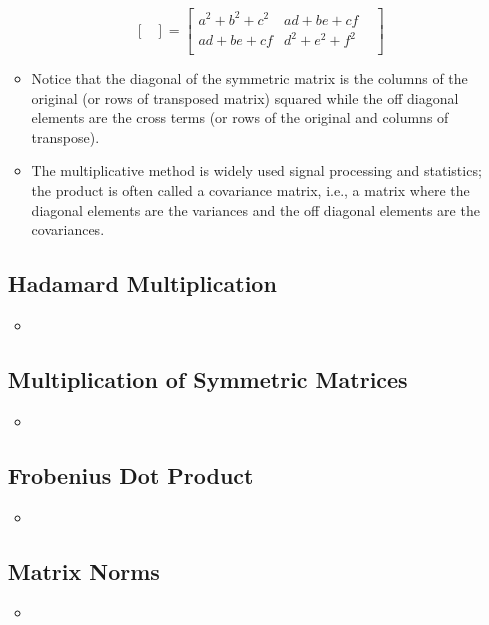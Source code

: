 \begin{itemize}
\begin{itemize}
\[\begin{bmatrix}
      \end{bmatrix}
      =
      \begin{bmatrix}
      a^2+b^2+c^2 & ad+be+cf & \\
      ad+be+cf & d^2+e^2+f^2 &  \\
      \end{bmatrix}
      \]%
      \item Notice that the diagonal of the symmetric matrix is the columns of the original (or rows of transposed matrix) squared while the off diagonal elements are the cross terms (or rows of the original and columns of transpose).
      \item The multiplicative method is widely used signal processing and statistics; the product is often called a covariance matrix, i.e., a matrix where the diagonal elements are the variances and the off diagonal elements are the covariances.
  \end{itemize}
  
  \subsection{Hadamard Multiplication}\label{Hadamard Multiplication}
  \begin{itemize}
    \item 
  \end{itemize}
  
  \subsection{Multiplication of Symmetric Matrices}\label{Multiplication of Symmetric Matrices}
  \begin{itemize}
    \item 
  \end{itemize}

  \subsection{Frobenius Dot Product}\label{Frobenius Dot Product}
  \begin{itemize}
    \item 
  \end{itemize}
  
  \subsection{Matrix Norms}\label{Other Matrix Norms}
  \begin{itemize}
    \item 
  \end{itemize}
\end{itemize}